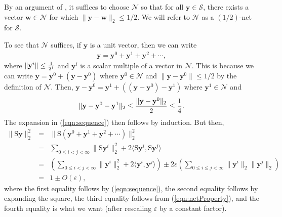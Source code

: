 \documentclass[11pt]{article}
\newcommand{\mat}[1]{{\ensuremath{\bm{\mathrm{#1}}}}}
\def\matS{\mat{S}}
\def\w{{\mathbf{w}}}
\def\frac#1#2{{#1\over #2}}
\def\y{{\mathbf y}}
\newcommand{\eps}{\varepsilon}
\begin{document}
By an argument of \cite{AHK06,fo05,m07}, it suffices to choose $\mathcal{N}$ 
so that for all $\y \in \mathcal{S}$, 
there exists a vector $\w \in \mathcal{N}$ for which $\|\y-\w\|_2 \leq 1/2$. We will refer to $\mathcal{N}$
as a $(1/2)$-net for $\mathcal{S}$. 

To see that $\mathcal{N}$ suffices, if $\y$ is a unit
vector, then we can write 
\begin{eqnarray}\label{eqn:sequence}
\y = \y^0 + \y^1 + \y^2 + \cdots,
\end{eqnarray}
where $\|\y^i\| \leq \frac{1}{2^i}$ and $\y^i$ is a scalar multiple of a vector in $\mathcal{N}$. This is
because we can write $\y = \y^0 + (\y-\y^0)$ where $\y^0 \in \mathcal{N}$ and 
$\|\y-\y^0\| \leq 1/2$ by the definition of $\mathcal{N}$. 
Then, $\y-\y^0 = \y^1 + ((\y-\y^0)-\y^1)$ where $\y^1 \in \mathcal{N}$ and 
$$\|\y-\y^0 - \y^1\|_2 \leq \frac{\|\y-\y^0\|_2}{2} \leq \frac{1}{4}.$$
The expansion in (\ref{eqn:sequence}) then follows by induction. But then, 
\begin{eqnarray*}
\|\matS \y\|_2^2 & = & \|\matS(\y^0 + \y^1 + \y^2 + \cdots)\|_2^2\\
& = & \sum_{0 \leq i < j < \infty} \|\matS \y^i\|_2^2 + 2 \langle \matS \y^i, \matS \y^j \rangle\\
& = & \left (\sum_{0 \leq i < j < \infty} \|\y^i\|_2^2 + 2 \langle \y^i, \y^j \rangle \right ) 
\pm 2\eps \left (\sum_{0 \leq i \leq j < \infty} \|\y^i\|_2 \|\y^j\|_2 \right )\\
& = & 1 \pm O(\eps),
\end{eqnarray*}
where the first equality follows by (\ref{eqn:sequence}), the second equality follows by expanding the
square, the third equality follows from (\ref{eqn:netProperty}), and the fourth equality is what we want
(after rescaling $\eps$ by a constant factor). 
\end{document}
